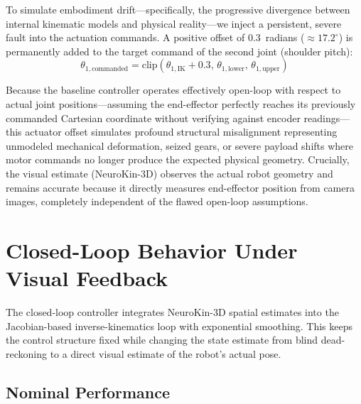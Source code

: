 \documentclass[12pt,a4paper,oneside]{report}
\begin{document}
To simulate embodiment drift---specifically, the progressive divergence between internal kinematic models and physical reality---we inject a persistent, severe fault into the actuation commands. A positive offset of 0.3~radians ($\approx 17.2^\circ$) is permanently added to the target command of the second joint (shoulder pitch):
\begin{equation}\theta_{1,\text{commanded}} = \text{clip}(\theta_{1,\text{IK}} + 0.3, \, \theta_{1,\text{lower}}, \, \theta_{1,\text{upper}})
\end{equation}

Because the baseline controller operates effectively open-loop with respect to actual joint positions---assuming the end-effector perfectly reaches its previously commanded Cartesian coordinate without verifying against encoder readings---this actuator offset simulates profound structural misalignment representing unmodeled mechanical deformation, seized gears, or severe payload shifts where motor commands no longer produce the expected physical geometry. Crucially, the visual estimate (NeuroKin-3D) observes the actual robot geometry and remains accurate because it directly measures end-effector position from camera images, completely independent of the flawed open-loop assumptions.
\section{Closed-Loop Behavior Under Visual Feedback}

The closed-loop controller integrates NeuroKin-3D spatial estimates into the Jacobian-based inverse-kinematics loop with exponential smoothing. This keeps the control structure fixed while changing the state estimate from blind dead-reckoning to a direct visual estimate of the robot's actual pose.
\subsection{Nominal Performance}
\label{subsec:nominal_performance}
\end{document}
